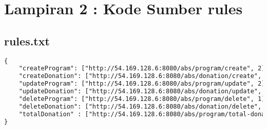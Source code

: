 \chapter*{Lampiran 2 : Kode Sumber rules}
\section*{rules.txt}
\begin{lstlisting}[caption={Berkas \co{compute.xml}},label={lst:excomp},language=XML]
{
	"createProgram": ["http://54.169.128.6:8080/abs/program/create", 2],
	"createDonation": ["http://54.169.128.6:8080/abs/donation/create", 4],
	"updateProgram": ["http://54.169.128.6:8080/abs/program/update", 2],
	"updateDonation": ["http://54.169.128.6:8080/abs/donation/update", 4],
	"deleteProgram": ["http://54.169.128.6:8080/abs/program/delete", 1],
	"deleteDonation": ["http://54.169.128.6:8080/abs/donation/delete", 1],
	"totalDonation" : ["http://54.169.128.6:8080/abs/program/total-donation", 1]
}
\end{lstlisting}


